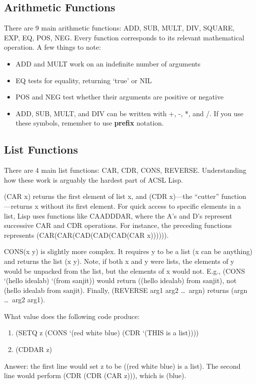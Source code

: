 \documentclass[10pt]{article}
\begin{document}
\subsection{Arithmetic Functions}
There are 9 main arithmetic functions: ADD, SUB, MULT, DIV, SQUARE,
EXP, EQ, POS, NEG.
Every function corresponds to its relevant mathematical operation.
A few things to note:
\begin{itemize}
    \item ADD and MULT work on an indefinite number of arguments
    \item EQ tests for equality, returning `true' or NIL
    \item POS and NEG test whether their arguments are positive or negative
    \item ADD, SUB, MULT, and DIV can be written with +, -, *, and /.
    If you use these symbols, remember to use \textbf{prefix} notation.
\end{itemize}

\subsection{List Functions}
There are 4 main list functions: CAR, CDR, CONS, REVERSE.
Understanding how these work is arguably the hardest part of ACSL Lisp.

(CAR x) returns the first element of list x, and (CDR x)---the ``cutter'' function---returns
x without its first element.
For quick access to specific elements in a list, Lisp
uses functions like CAADDDAR, where the A's and D's represent successive
CAR and CDR operations.
For instance, the preceding functions represents (CAR(CAR(CAD(CAD(CAD(CAR x)))))).

CONS(x y) is slightly more complex.
It requires y to be a list (x can be anything) and returns the list (x y).
Note, if both x and y were lists, the elements of y would be unpacked from
the list, but the elements of x would not.
E.g., (CONS `(hello idealab) `(from sanjit)) would return ((hello idealab) from sanjit),
not (hello idealab from sanjit).
Finally, (REVERSE arg1 arg2 \ldots~argn) returns (argn \ldots~arg2 arg1).

What value does the following code produce:
\begin{enumerate}
    \item (SETQ z (CONS `(red white blue) (CDR `(THIS is a list))))
    \item (CDDAR z)
\end{enumerate}
Answer: the first line would set z to be ((red white blue) is a list).
The second line would perform (CDR (CDR (CAR z))), which is (blue).
\end{document}
